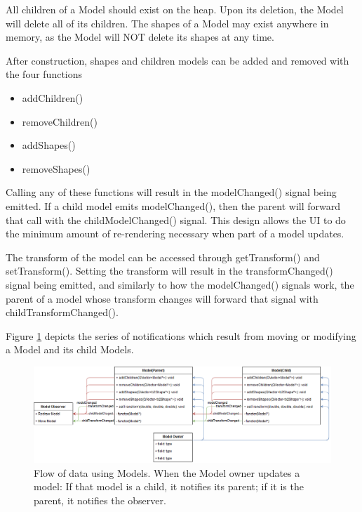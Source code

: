 All children of a Model should exist on the heap. Upon its deletion, the Model will delete all of its children. The shapes of a Model may exist anywhere in memory, as the Model will NOT delete its shapes at any time. 
 
After construction, shapes and children models can be added and removed with the four functions
 \begin{itemize}
 	\item addChildren()
 	\item removeChildren()
 	\item addShapes()
 	\item removeShapes()
 \end{itemize} 
 
 Calling any of these functions will result in the modelChanged() signal being emitted. If a child model emits modelChanged(), then the parent will forward that call with the childModelChanged() signal. This design allows the UI to do the minimum amount of re-rendering necessary when part of a model updates.
 
 The transform of the model can be accessed through getTransform() and setTransform(). Setting the transform will result in the transformChanged() signal being emitted, and similarly to how the modelChanged() signals work, the parent of a model whose transform changes will forward that signal with childTransformChanged().
 
 Figure \ref{uml:dataflow_model} depicts the series of notifications which result from moving or modifying a Model and its child Models.
 \begin{figure}[h]
 	\begin{center}
 	\includegraphics[width=\textwidth]{./images_design/uml/DataFlow_Model}
 	\caption{Flow of data using Models. When the Model owner updates a model: If that model is a child, it notifies its parent; if it is the parent, it notifies the observer.\label{uml:dataflow_model}}
 	\end{center}
 \end{figure}   
 
